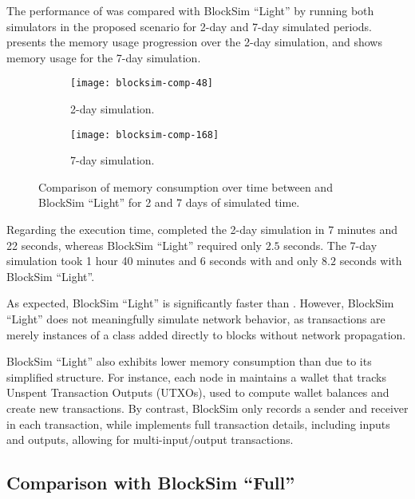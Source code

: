 The performance of \iblock{} was compared with BlockSim ``Light'' by running
both simulators in the proposed scenario for 2-day and 7-day simulated periods.
 presents the memory usage progression over the
2-day simulation, and  shows memory usage for
the 7-day simulation.

\begin{figure}[p]
	\centering
	\begin{subfigure}[b]{0.85\textwidth}
		\centering
		\texttt{[image: blocksim-comp-48]}
		\caption{2-day simulation.}\label{subfig:comparison-48h}
	\end{subfigure}
	\par\bigskip\medskip
	\begin{subfigure}[b]{0.85\textwidth}
		\centering
		\texttt{[image: blocksim-comp-168]}
		\caption{7-day simulation.}\label{subfig:comparison-168h}
	\end{subfigure}
	\caption{Comparison of memory consumption over time between \iblock{}
	and BlockSim ``Light'' for 2 and 7 days of simulated
	time.}\label{fig:comparison-light}
\end{figure}

Regarding the execution time, \iblock{} completed the 2-day simulation in 7
minutes and 22 seconds, whereas BlockSim ``Light'' required only \(2.5\)
seconds. The 7-day simulation took 1 hour 40 minutes and 6 seconds with
\iblock{} and only \(8.2\) seconds with BlockSim ``Light''.

As expected, BlockSim ``Light'' is significantly faster than \iblock{}.
However, BlockSim ``Light'' does not meaningfully simulate network behavior, as
transactions are merely instances of a class added directly to blocks without
network propagation.

BlockSim ``Light'' also exhibits lower memory consumption than \iblock{} due to
its simplified structure. For instance, each node in \iblock{} maintains a
wallet that tracks Unspent Transaction Outputs (UTXOs), used to compute wallet
balances and create new transactions. By contrast, BlockSim only records a
sender and receiver in each transaction, while \iblock{} implements full
transaction details, including inputs and outputs, allowing for
multi-input/output transactions.

\subsection{Comparison with BlockSim ``Full''}

